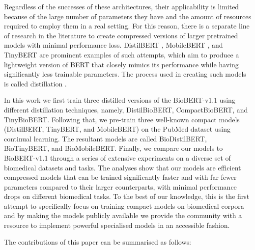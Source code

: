 \documentclass{article}
\begin{document}
Regardless of the successes of these architectures, their applicability is limited because of the large number of parameters they have and the amount of resources required to employ them in a real setting. For this reason, there is a separate line of research in the literature to create compressed versions of larger pretrained models with minimal performance loss. DistilBERT \citep{sanh2019distilbert}, MobileBERT \citep{sun-etal-2020-mobilebert}, and TinyBERT \citep{jiao-etal-2020-tinybert} are prominent examples of such attempts, which aim to produce a lightweight version of BERT that closely mimics its performance while having significantly less trainable parameters. The process used in creating such models is called distillation \citep{hinton2015distilling}. 




In this work we first train three distilled versions of the BioBERT-v1.1 using different distillation techniques, namely, DistilBioBERT, CompactBioBERT, and TinyBioBERT. Following that, we pre-train three well-known compact models (DistilBERT, TinyBERT, and MobileBERT) on the PubMed dataset using continual learning. The resultant models are called BioDistilBERT, BioTinyBERT, and BioMobileBERT. Finally, we compare our models to BioBERT-v1.1 through a series of extensive experiments on a diverse set of biomedical datasets and tasks. The analyses show that our models are efficient compressed models that can be trained significantly faster and with far fewer parameters compared to their larger counterparts, with minimal performance drops on different biomedical tasks. To the best of our knowledge, this is the first attempt to specifically focus on training compact models on biomedical corpora and by making the models publicly available we provide the community with a resource to implement powerful specialised models in an accessible fashion.     

The contributions of this paper can be summarised as follows:
\end{document}
